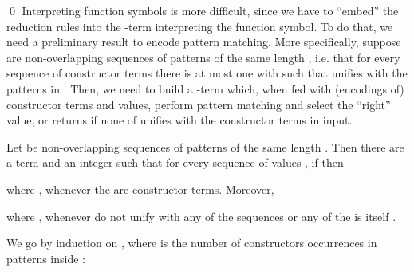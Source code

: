 \documentclass{LMCS}
\newcounter{number}
\begin{document}
\qed
Interpreting function symbols is more difficult, since we have to ``embed'' the reduction rules
into the -term interpreting the function symbol. To do that, we need a preliminary
result to encode pattern matching. More specifically, suppose  are
non-overlapping sequences of patterns of the same length , i.e. that for every
sequence of constructor terms  there is at most one  with
 such that  unifies with the patterns
in . Then, we need to build a -term 
 which, when fed with  (encodings of) constructor
terms and  values, perform pattern matching and select the ``right'' value, or returns
 if none of  unifies with the constructor terms
in input. 
\begin{lem}\label{lemma:pm}
Let  be non-overlapping sequences of patterns of the same length .
Then there are a term  and an integer  such that
for every sequence of values ,
if  then

where , whenever the  are constructor terms. Moreover,

where ,
whenever  do not unify with
any of the sequences  or any of 
the  is itself .
\end{lem}
\proof
We go by induction on , where
 is the number of constructors occurrences in patterns
inside :
\end{document}
